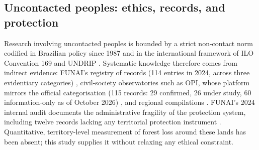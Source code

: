 \subsection{Uncontacted peoples: ethics, records, and protection}
Research involving uncontacted peoples is bounded by a strict non-contact norm codified in Brazilian policy since 1987 \citep{pringle2014} and in the international framework of ILO Convention 169 \citep{ilo169} and UNDRIP \citep{undrip}. Systematic knowledge therefore comes from indirect evidence: FUNAI's registry of records (114 entries in 2024, across three evidentiary categories) \citep{funai_audit_2024}, civil-society observatories such as OPI, whose platform mirrors the official categorisation (115 records: 29 confirmed, 26 under study, 60 information-only as of October 2026) \citep{opi2025}, and regional compilations \citep{raisg2024}. FUNAI's 2024 internal audit documents the administrative fragility of the protection system, including twelve records lacking any territorial protection instrument \citep{funai_audit_2024}. Quantitative, territory-level measurement of forest loss around these lands has been absent; this study supplies it without relaxing any ethical constraint.

